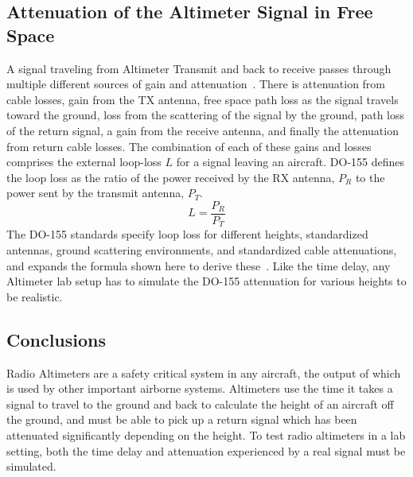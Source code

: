 \subsection{Attenuation of the Altimeter Signal in Free Space}
A signal traveling from Altimeter Transmit and back to receive passes through multiple different sources of gain and attenuation~\cite{noauthor_minimum_1974}. There is attenuation from cable losses, gain from the TX antenna, free space path loss as the signal travels toward the ground, loss from the scattering of the signal by the ground, path loss of the return signal, a gain from the receive antenna, and finally the attenuation from return cable losses. The combination of each of these gains and losses comprises the external loop-loss $L$ for a signal leaving an aircraft. DO-155 defines the loop loss as the ratio of the power received by the RX antenna, $P_R$ to the power sent by the transmit antenna, $P_T$.
$$ L = \frac{P_R}{P_T}$$
The DO-155 standards specify loop loss for different heights, standardized antennas,  ground scattering environments, and standardized cable attenuations, and expands the formula shown here to derive these~\cite{noauthor_minimum_1974}. Like the time delay, any Altimeter lab setup has to simulate the DO-155 attenuation for various heights to be realistic. 
\subsection{Conclusions}
Radio Altimeters are a safety critical system in any aircraft, the output of which is used by other important airborne systems. Altimeters use the time it takes a signal to travel to the ground and back to calculate the height of an aircraft off the ground, and must be able to pick up a return signal which has been attenuated significantly depending on the height. To test radio altimeters in a lab setting, both the time delay and attenuation experienced by a real signal must be simulated. 
